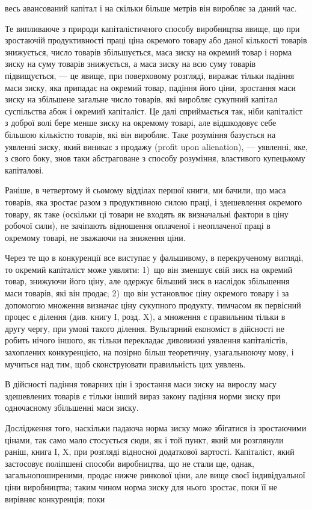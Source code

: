 \parcont{}  %
весь авансований капітал і на скільки більше метрів він виробляє за даний час.

Те випливаюче з природи капіталістичного способу виробництва явище, що при зростаючій продуктивності
праці ціна окремого товару або даної кількості товарів знижується, число товарів збільшується, маса
зиску на окремий товар і норма зиску на суму товарів знижується, а маса зиску на всю суму товарів
підвищується, — це явище, при поверховому розгляді, виражає тільки падіння маси зиску, яка припадає
на окремий товар, падіння його ціни, зростання маси зиску на збільшене загальне
число товарів, які виробляє сукупний капітал суспільства абож і окремий капіталіст. Це далі
сприймається так, ніби капіталіст з доброї волі бере менше зиску на окремому товарі, але відшкодовує
себе більшою кількістю товарів, які він виробляє. Таке розуміння базується на уявленні зиску, який
виникає з продажу (profit upon alienation), — уявленні, яке, з свого боку, знов таки абстраговане з
способу розуміння, властивого купецькому капіталові.

Раніше, в четвертому й сьомому відділах першої книги, ми бачили, що маса товарів, яка зростає разом
з продуктивною силою праці, і здешевлення окремого товару, як таке (оскільки ці товари не входять як
визначальні фактори в ціну робочої сили), не зачіпають відношення оплаченої і неоплаченої праці в
окремому товарі, не зважаючи на зниження ціни.

Через те що в конкуренції все виступає у фальшивому, в перекрученому вигляді, то окремий капіталіст
може уявляти: 1)~що він зменшує свій зиск на окремий товар, знижуючи його ціну, але одержує більший
зиск в наслідок збільшення маси товарів, які він продає; 2)~що він установлює ціну окремого товару і
за допомогою множення визначає ціну сукупного продукту, тимчасом як первісний процес є ділення (див.
книгу І, розд. X), а множення є правильним тільки в другу чергу, при умові такого ділення.
Вульгарний економіст в дійсності не робить нічого іншого, як тільки перекладає дивовижні уявлення
капіталістів, захоплених конкуренцією, на позірно більш теоретичну, узагальнюючу мову, і мучиться
над тим, щоб сконструювати правильність цих уявлень.

В дійсності падіння товарних цін і зростання маси зиску на вирослу масу здешевлених товарів є тільки
інший вираз закону падіння норми зиску при одночасному збільшенні маси зиску.

Дослідження того, наскільки падаюча норма зиску може збігатися із зростаючими цінами, так само мало
стосується сюди, як і той пункт, який ми розглянули раніш, книга I, X, при розгляді відносної
додаткової вартості. Капіталіст, який застосовує поліпшені способи виробництва, що не стали ще,
однак, загальнопоширеними, продає нижче ринкової ціни, але вище своєї індивідуальної ціни
виробництва; таким чином норма зиску для нього зростає, поки її не вирівняє конкуренція; поки
\parbreak{}  %
